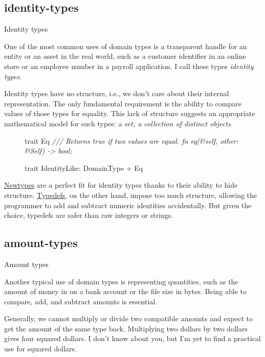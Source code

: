 \documentclass{article}
\begin{document}
\subsection{identity-types}{Identity types}

One of the most common uses of domain types is a transparent handle for an entity or an asset in the real world, such as a customer identifier in an online store or an employee number in a payroll application.
I call these types \em{identity types}.

Identity types have no structure, i.e., we don't care about their internal representation.
The only fundamental requirement is the ability to compare values of those types for equality.
This lack of structure suggests an appropriate mathematical model for such types: a \em{set}, a collection of distinct objects.

\begin{figure}
\begin{code}
trait Eq {
  \em{/// Returns true if two values are equal.}
  fn eq(&self, other: &Self) -> bool;
}

trait IdentityLike: DomainType + Eq {}
\end{code}
\end{figure}

\href{#newtypes}{Newtypes} are a perfect fit for identity types thanks to their ability to hide structure.
\href{#typdefs}{Typedefs}, on the other hand, impose too much structure, allowing the programmer to add and subtract numeric identities accidentally.
But given the choice, typedefs are safer than raw integers or strings.

\subsection{amount-types}{Amount types}

Another typical use of domain types is representing quantities, such as the amount of money in  on a bank account or the file size in bytes.
Being able to compare, add, and subtract amounts is essential.

Generally, we cannot multiply or divide two compatible amounts and expect to get the amount of the same type back.
Multiplying two dollars by two dollars gives four squared dollars.
I don't know about you, but I'm yet to find a practical use for squared dollars.
\end{document}

